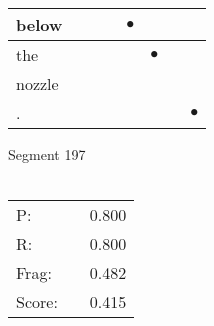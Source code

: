 \documentclass[landscape]{article}
\newcommand{\ssp}{\hspace{2pt}}
\newcommand{\mex}{\cellcolor{g}$\bullet$}
\begin{document}
\begin{tabular}{|l|p{10pt}|p{10pt}|p{10pt}|p{10pt}|p{10pt}|p{10pt}|p{10pt}|}
\hline
\ssp \cellcolor{ref3}below \ssp&\hspace{2pt}&\hspace{2pt}&\hspace{2pt}&\hspace{2pt}\mex&\hspace{2pt}&\hspace{2pt}&\hspace{2pt}\\
\hline
\ssp \cellcolor{ref4}the \ssp&\hspace{2pt}&\hspace{2pt}&\hspace{2pt}&\hspace{2pt}&\hspace{2pt}\mex&\hspace{2pt}&\hspace{2pt}\\
\hline
\ssp nozzle \ssp&\hspace{2pt}&\hspace{2pt}&\hspace{2pt}&\hspace{2pt}&\hspace{2pt}&\hspace{2pt}&\hspace{2pt}\\
\hline
\ssp \cellcolor{ref6}. \ssp&\hspace{2pt}&\hspace{2pt}&\hspace{2pt}&\hspace{2pt}&\hspace{2pt}&\hspace{2pt}&\hspace{2pt}\mex\\
\hline
\end{tabular}

\vspace{6pt}
\noindent Segment 197\\\\
\noindent\begin{tabular}{lm{12pt}r}
\hline
P:&&0.800\\
R:&&0.800\\
Frag:&&0.482\\
Score:&&0.415\\
\end{tabular}

\newpage
\end{document}
